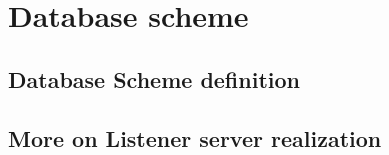
\section{Database scheme}
\label{db}

\subsection{Database Scheme definition}

\subsection{More on Listener server realization}
